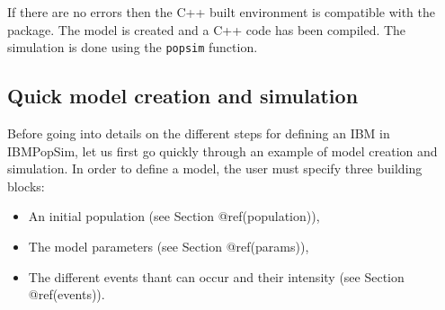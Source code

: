 If there are no errors then the C++ built environment is compatible with the package. The model is created and a C++ code has been compiled. The simulation is done using the \texttt{popsim} function.

\begin{Shaded}
\begin{Highlighting}[]
\StringTok{ }\NormalTok{(}
                   \NormalTok{(}\NormalTok{ =}\StringTok{ }\OperatorTok{$}\NormalTok{ =}\StringTok{ }\OperatorTok{$}
                   \NormalTok{)}

\StringTok{ }\OperatorTok{$}\OperatorTok{$}\OperatorTok{{-}}\StringTok{ }
\StringTok{ }\NormalTok{(}\OperatorTok{!}\OperatorTok{$}\OperatorTok{$}
\NormalTok{(}\NormalTok{(}\NormalTok{ =}\StringTok{ }\NormalTok{ =}\StringTok{ }
\end{Highlighting}
\end{Shaded}

\hypertarget{quick-model-creation-and-simulation}{%
\subsection{Quick model creation and simulation}\label{quick-model-creation-and-simulation}}

Before going into details on the different steps for defining an IBM in IBMPopSim, let us first go quickly through an example of model creation and simulation.
In order to define a model, the user must specify three building blocks:

\begin{itemize}
\tightlist
\item
  An initial population (see Section @ref(population)),
\item
  The model parameters (see Section @ref(params)),
\item
  The different events thant can occur and their intensity (see Section @ref(events)).
\end{itemize}

